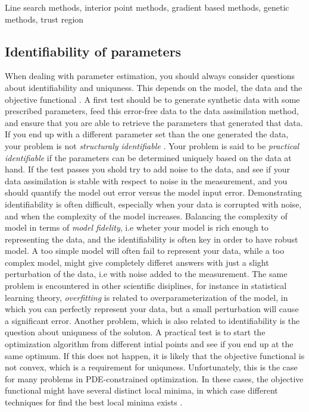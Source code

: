 Line search methods, interior point methods, gradient based methods,
genetic methods, trust region



\subsection{Identifiability of parameters}
When dealing with parameter estimation, you should always consider
questions about identifiability and uniquness. This depends on the
model, the data and the objective functional
\cite{hadjicharalambous2015analysis}. A first test should be to
generate synthetic data with some prescribed parameters, feed this
error-free data to the data assimilation method, and ensure that you
are able to retrieve the parameters that generated that data. If you
end up with a different parameter set than the one generated the data,
your problem is not \emph{structuraly identifiable}
\cite{chabiniok2016multiphysics}. Your problem is said to be
\emph{practical identifiable} if the parameters can be determined
uniquely based on the data at hand. If the test passes you shold try
to add noise to the data, and see if your data assimilation is stable
with respect to noise in the measurement, and you should quantify the
model out error versus the model input error. Demonstrating identifiability is
often difficult, especially when your data is corrupted with noise,
and when the complexity of the model increases. Balancing the
complexity of model in terms of \emph{model fidelity}, i.e wheter your
model is rich enough to representing the data, and the identifiability
is often key in order to have robust model. A too simple model will
often fail to represent your data, while a too complex model, might
give completely differet answers with just a slight perturbation of
the data, i.e with noise added to the measurement. The same problem is
encountered in other scientific disiplines, for instance in
statistical learning theory, \emph{overfitting} is related to
overparameterization of the model, in which you can perfectly
represent your data, but a small perturbation will cause a significant
error. Another problem, which is also related to identifiability is
the question about uniquness of the soluton. A practical test is to
start the optimization algorithm from different intial points and see
if you end up at the same optimum. If this does not happen, it is
likely that the objective functional is not convex, which is a
requirement for uniquness. Unfortunately, this is the case for many
problems in PDE-constrained optimization. In these cases, the objective
functional might have several distinct local minima, in which case
different techniques for find the best local minima exists
\cite{farrell2015multiple}. 

